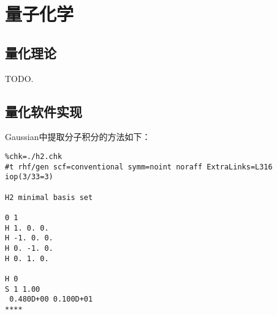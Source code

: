 \documentclass[10pt]{ctexrep}
\begin{document}
      


\chapter[QC]{量子化学}
\section{量化理论}

TODO.

\section{量化软件实现}
Gaussian中提取分子积分的方法如下：
\begin{verbatim}
%chk=./h2.chk
#t rhf/gen scf=conventional symm=noint noraff ExtraLinks=L316 iop(3/33=3)

H2 minimal basis set

0 1
H 1. 0. 0.
H -1. 0. 0.
H 0. -1. 0.
H 0. 1. 0.

H 0
S 1 1.00
 0.480D+00 0.100D+01
****
\end{verbatim}
\end{document}
